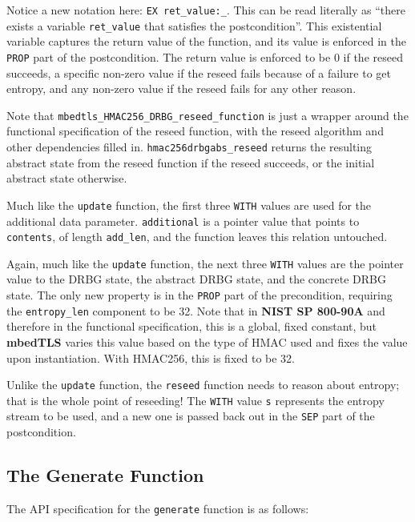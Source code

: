 \documentclass[pageno]{jpaper}
\newcommand{\stdtitle}[1]{\textbf{#1}}
\begin{document}
Notice a new notation here: \lstinline{EX ret_value:_}. This can be read literally as “there exists a variable \lstinline{ret_value} that satisfies the postcondition”. This existential variable captures the return value of the function, and its value is enforced in the \lstinline{PROP} part of the postcondition. The return value is enforced to be 0 if the reseed succeeds, a specific non-zero value if the reseed fails because of a failure to get entropy, and any non-zero value if the reseed fails for any other reason.

Note that \lstinline{mbedtls_HMAC256_DRBG_reseed_function} is just a wrapper around the functional specification of the reseed function, with the reseed algorithm and other dependencies filled in. \lstinline{hmac256drbgabs_reseed} returns the resulting abstract state from the reseed function if the reseed succeeds, or the initial abstract state otherwise.

Much like the \lstinline{update} function, the first three \lstinline{WITH} values are used for the additional data parameter. \lstinline{additional} is a pointer value that points to \lstinline{contents}, of length \lstinline{add_len}, and the function leaves this relation untouched.

Again, much like the \lstinline{update} function, the next three \lstinline{WITH} values are the pointer value to the DRBG state, the abstract DRBG state, and the concrete DRBG state. The only new property is in the \lstinline{PROP} part of the precondition, requiring the \lstinline{entropy_len} component to be 32. Note that in \stdtitle{NIST SP 800-90A} and therefore in the functional specification, this is a global, fixed constant, but \stdtitle{mbedTLS} varies this value based on the type of HMAC used and fixes the value upon instantiation. With HMAC256, this is fixed to be 32.

Unlike the \lstinline{update} function, the \lstinline{reseed} function needs to reason about entropy; that is the whole point of reseeding! The \lstinline{WITH} value \lstinline{s} represents the entropy stream to be used, and a new one is passed back out in the \lstinline{SEP} part of the postcondition.

\subsection{The Generate Function}

The API specification for the \lstinline{generate} function is as follows:
\end{document}
